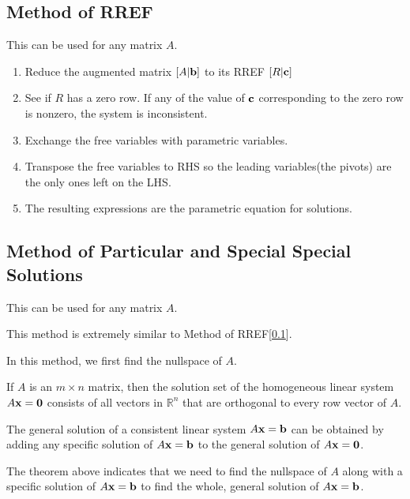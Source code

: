 \documentclass{report}
\begin{document}
		\subsection{Method of RREF}\label{mthd_rref}
		
		This can be used for any matrix $A$.
		
		\begin{enumerate}
			\item Reduce the augmented matrix $\left[A|\bf{b}\right]$ to its RREF $\left[R|\bf{c}\right]$
			\item See if $R$ has a zero row. If any of the value of $\bf{c}$ corresponding to the zero row is nonzero, the system is inconsistent.
			\item Exchange the free variables with parametric variables.
			\item Transpose the free variables to RHS so the leading variables(the pivots) are the only ones left on the LHS.
			\item The resulting expressions are the parametric equation for solutions.
		\end{enumerate}
		
		\subsection{Method of Particular and Special Special Solutions}
			
			This can be used for any matrix $A$.
			
			This method is extremely similar to Method of RREF[\ref{mthd_rref}].
			
			In this method, we first find the nullspace of $A$.
			
			\begin{thm}
				If $A$ is an $m \times n$ matrix, then the solution set of the homogeneous linear system $A\bf{x}=\bf{0}$ consists of all vectors in $\mathbb{R}^n$ that are orthogonal to every row vector of $A$.
			\end{thm}
			
			\begin{thm}
				The general solution of a consistent linear system $A\bf{x}=\bf{b}$ can be obtained by adding any specific solution of $A\bf{x}=\bf{b}$ to the general solution of $A\bf{x}=\bf{0}$.
			\end{thm}
			
			The theorem above indicates that we need to find the nullspace of $A$ along with a specific solution of $A\bf{x}=\bf{b}$ to find the whole, general solution of $A\bf{x}=\bf{b}$.
			
\end{document}
